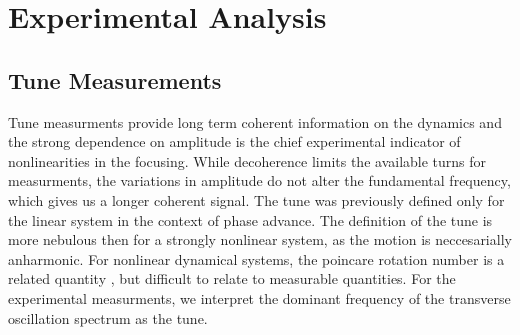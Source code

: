 \chapter{Experimental Analysis} \label{chap:analysis}


\section{Tune Measurements} \label{sec:tune}
Tune measurments provide long term coherent information on the dynamics and the strong dependence on amplitude is the chief experimental indicator of nonlinearities in the focusing. While decoherence limits the available turns for measurments, the variations in amplitude do not alter the fundamental frequency, which gives us a longer coherent signal. The tune was previously defined only for the linear system in the context of phase advance. The definition of the tune is more nebulous then for a strongly nonlinear system, as the motion is neccesarially anharmonic. For nonlinear dynamical systems, the poincare rotation number is a related quantity \cite{nagaitsevBetatron}, but difficult to relate to measurable quantities. For the experimental measurments, we interpret the dominant frequency of the transverse oscillation spectrum as the tune. 

